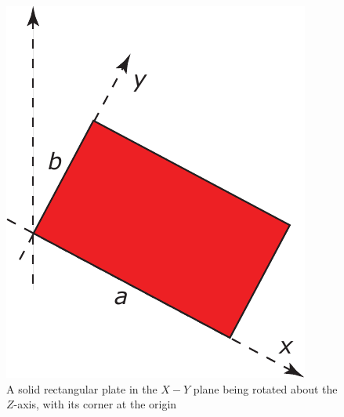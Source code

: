 \begin{figure}[H]
  \centering
  \includegraphics[width=0.25\linewidth]{fig/images/solid_plate.pdf}
  \caption{A solid rectangular plate in the $X-Y$ plane being rotated about the $Z$-axis, with its corner at the origin}
  \label{fig:solid_plate}
\end{figure}